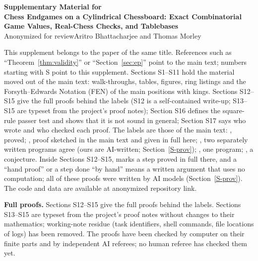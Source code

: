 \documentclass[10pt]{article}
\newcommand{\anoncodeurl}{anonymized repository link}
\newcommand{\codeavail}{available at \anoncodeurl}
\newcommand{\codeavail}{available at \url{https://github.com/aritroBh/cylindrical-chess-cgt}}
\theoremstyle{plain}
\theoremstyle{definition}
\begin{document}
\begin{center}
{\Large\bfseries Supplementary Material for\\[2pt]
Chess Endgames on a Cylindrical Chessboard: Exact Combinatorial Game Values, Real-Chess Checks, and Tablebases}\\[8pt]
\ifdefined\anonbuild Anonymized for review\else Aritro Bhattacharjee and Thomas Morley\fi
\end{center}

\noindent This supplement belongs to the paper of the same title. References such as ``Theorem~\ref{thm:validity}'' or
``Section~\ref{sec:ep}'' point to the main text; numbers starting with S point to this supplement. Sections S1--S11 hold
the material moved out of the main text: walk-throughs, tables, figures, ring listings and the Forsyth--Edwards
Notation (FEN) of the main positions with kings. Sections S12--S15 give the full proofs behind the  labels (S12 is a self-contained write-up; S13--S15 are
typeset from the project's proof notes); Section S16 defines the square-rule passer test and shows that it is not sound in general; Section S17 says who wrote and who checked each proof. The labels are those of the main text: , proved; , proof
sketched in the main text and given in full here; , two separately written programs agree (ours are AI-written; Section~\ref{S-prov}); , one
program; , a conjecture. Inside Sections S12--S15,  marks a step proved in full there, and a ``hand proof'' or a step done ``by hand'' means a written argument that uses no computation; all of these proofs were written by AI models (Section~\ref{S-prov}). The code and data are \codeavail.

\tableofcontents












\clearpage
\noindent\textbf{Full proofs.} Sections S12--S15 give the full proofs behind the  labels. Sections S13--S15 are typeset from the
project's proof notes without changes to their mathematics; working-note residue (task identifiers, shell commands,
file locations of logs) has been removed. The  proofs have been checked by computer on their finite parts and
by independent AI referees; no human referee has checked them yet.

\clearpage

\clearpage

\clearpage

\clearpage




\end{document}
